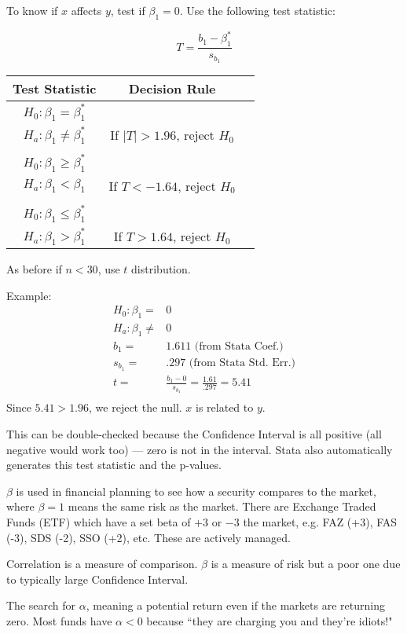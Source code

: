 \documentclass[11pt, oneside]{article}   	%
\begin{document}
To know if $x$ affects $y$, test if $\beta_1 = 0$.  Use the following test statistic:

\[
T = \frac{b_1 - \beta_1^*} {s_{b_1}}
\]

 \begin{tabular}{ c  c c }
Test Statistic & Decision Rule \\
\hline
$H_0 : \beta_1 = \beta_1^*$ \\      $H_a : \beta_1 \neq \beta_1^*$ & If $|T| > 1.96$, reject $H_0$ \\
 & \\
$H_0 : \beta_1 \geq \beta_1^*$ \\ $H_a : \beta_1 < \beta_1$      & If $T < -1.64$, reject $H_0$ \\
 & \\
$H_0 : \beta_1 \leq \beta_1^*$ \\ $H_a : \beta_1 > \beta_1^*$      & If $T > 1.64$, reject $H_0$ \\
\end{tabular}

As before if $n < 30$, use $t$ distribution. 

Example:
\begin{align*}
H_0 : \beta_1 =& 0\\
H_a : \beta_1 \neq& 0\\
b_1 =& 1.611 \text{ (from Stata Coef.)}\\
s_{b_1} =& .297 \text{ (from Stata Std. Err.)} \\
t =& \frac{b_1 - 0}{s_{b_1}} = \frac{1.61}{.297} = 5.41\\
\end{align*}
Since $5.41 > 1.96$, we reject the null. $x$ is related to $y$. 

This can be double-checked because the Confidence Interval is all positive (all negative would work too) --- zero is not in the interval. Stata also automatically generates this test statistic and the p-values.

$\beta$ is used in financial planning to see how a security compares to the market, where $\beta = 1$ means the same risk as the market. There are Exchange Traded Funds (ETF) which have a set beta of $+3$ or $-3$ the market, e.g. FAZ (+3), FAS (-3), SDS (-2), SSO (+2), etc. These are actively managed.

Correlation is a measure of comparison. $\beta$ is a measure of risk but a poor one due to typically large Confidence Interval.

The search for $\alpha$, meaning a potential return even if the markets are returning zero. Most funds have $\alpha < 0$ because ``they are charging you and they're idiots!"
\end{document}
